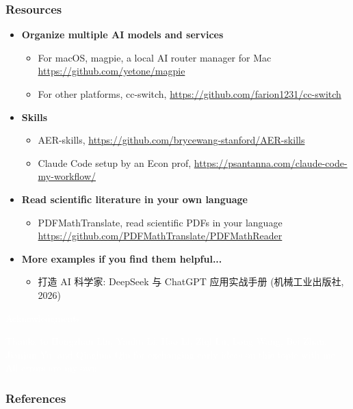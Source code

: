 \documentclass[aspectratio=169]{beamer}
\newcommand{\referencesize}{\tiny}
\begin{document}
\begin{frame}
  \frametitle{Resources}
  \begin{itemize}
      \item \textbf{Organize multiple AI models and services}
        \begin{itemize}
          \item For macOS, magpie, a local AI router manager for Mac \url{https://github.com/yetone/magpie} 
          \item For other platforms, cc-switch, \url{https://github.com/farion1231/cc-switch}
        \end{itemize}
      \item \textbf{Skills}
              \begin{itemize}
                \item AER-skills, \url{https://github.com/brycewang-stanford/AER-skills}
                \item Claude Code setup by an Econ prof, \url{https://psantanna.com/claude-code-my-workflow/}
              \end{itemize}
      \item \textbf{Read scientific literature in your own language}
        \begin{itemize}
          \item PDFMathTranslate, read scientific PDFs in your language \url{https://github.com/PDFMathTranslate/PDFMathReader} \parencite{ouyang-etal-2025-pdfmathtranslate}
        \end{itemize}
        \item \textbf{More examples if you find them helpful...}
        \begin{itemize}
          \item 打造 AI 科学家: DeepSeek 与 ChatGPT 应用实战手册 (机械工业出版社, 2026)
        \end{itemize}
  \end{itemize}
\end{frame}



{
  \begin{frame}
    \begin{center}
      \Huge{\textcolor{white}{Acknowledgments}}
    \end{center}
    \vspace{1cm}
    \normalsize{\textcolor{white}{Thanks to Hongzhan Lin, Yanlin Li, Hao Li, Ziqi Lu, Long Wang, Bei Zhan, Jianjun Yu, and Qinghua Qin for exchanging early ideas on this topic with me. All errors are my own.}}
  \end{frame}
}


\begin{frame}[allowframebreaks]
  \frametitle{References}
  \begingroup
  \referencesize\color{black}
  \printbibliography[notkeyword=chinese,heading=none]
  \endgroup
\end{frame}
\end{document}
